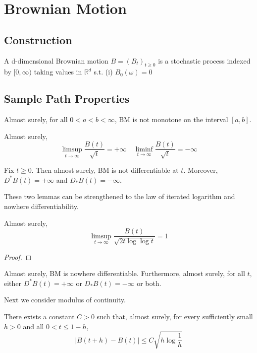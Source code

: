 \chapter{Brownian Motion}
\section{Construction}
\begin{definition}
    A d-dimensional Brownian motion $B=(B_t)_{t\geq 0}$ is a stochastic process indexed by $[0,\infty)$ taking values in $\mathbb{R}^d$ s.t. \newline 
    (i) $B_0(\omega)=0$

\end{definition}

\section{Sample Path Properties}
\begin{theorem}
    Almost surely, for all $0<a<b<\infty$, BM is not monotone on the interval $[a,b]$.
\end{theorem}

\begin{lemma}
    Almost surely, 
    \[\limsup_{t\to\infty}\frac{B(t)}{\sqrt{t}}=+\infty\quad \liminf_{t\to\infty}\frac{B(t)}{\sqrt{t}}=-\infty\]
\end{lemma}

\begin{lemma}
    Fix $t\geq 0$. Then almost surely, BM is not differentiable at $t$. 
    Moreover, $D^*B(t)=+\infty$ and $D_*B(t)=-\infty$.
\end{lemma}

These two lemmas can be strengthened to the law of iterated logarithm and nowhere differentiability.
\begin{theorem}
    Almost surely,
    \[\limsup_{t\to\infty}\frac{B(t)}{\sqrt{2t\log\log t}}=1\]
\end{theorem}
\begin{proof}
    
\end{proof}

\begin{theorem}
    Almost surely, BM is nowhere differentiable. Furthermore, almost surely, for all $t$,
    either $D^*B(t)=+\infty$ or $D_*B(t)=-\infty$ or both.
\end{theorem}


Next we consider modulus of continuity.
\begin{lemma}
    There exists a constant $C>0$ such that, almost surely, for every sufficiently small $h>0$ and all $0<t\leq 1-h$,
    \[|B(t+h)-B(t)|\leq C\sqrt{h\log\frac{1}{h}}\]
\end{lemma}

